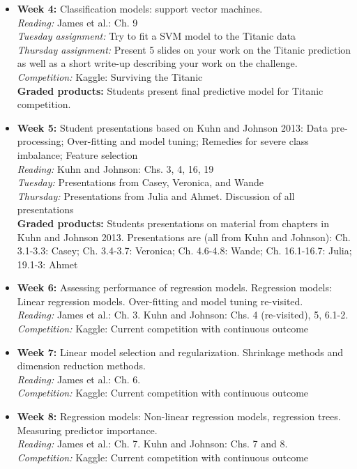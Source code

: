 \documentclass[11pt,oneside]{amsart}
\begin{document}
\begin{itemize}
\item \textbf{Week 4:} Classification models: support vector
  machines.\\
\emph{Reading:} James et al.: Ch. 9\\
\emph{Tuesday assignment:} Try to fit a SVM model to the Titanic data\\
\emph{Thursday assignment:} Present 5 slides on your work on the Titanic prediction as well as a short write-up describing your work on the challenge.\\
\emph{Competition:} Kaggle: Surviving the Titanic\\
\textbf{Graded products:} Students present final predictive model for Titanic
competition.

\item \textbf{Week 5:} Student presentations based on Kuhn and Johnson
  2013: Data pre-processing; Over-fitting and model tuning; Remedies
  for severe class imbalance; Feature selection\\
\emph{Reading:} Kuhn and Johnson: Chs. 3, 4, 16, 19\\
\emph{Tuesday:} Presentations from Casey, Veronica, and Wande\\
\emph{Thursday:} Presentations from Julia and Ahmet. Discussion of all presentations\\
\textbf{Graded products:} Students presentations on material from chapters in Kuhn and
Johnson 2013. Presentations are (all from Kuhn and Johnson): Ch. 3.1-3.3: Casey; Ch. 3.4-3.7: Veronica; Ch. 4.6-4.8: Wande; Ch. 16.1-16.7: Julia; 19.1-3: Ahmet\\

\item \textbf{Week 6:} Assessing performance of regression
  models. Regression models: Linear regression models. Over-fitting
  and model tuning re-visited.\\
\emph{Reading:} James et al.: Ch. 3. Kuhn and Johnson: Chs. 4
(re-visited), 5, 6.1-2.\\
\emph{Competition:} Kaggle: Current competition with continuous
outcome

\item \textbf{Week 7:} Linear model selection and
  regularization. Shrinkage methods and dimension reduction methods.\\
\emph{Reading:} James et al.: Ch. 6.\\
\emph{Competition:} Kaggle: Current competition with continuous
outcome

\item \textbf{Week 8:} Regression models: Non-linear regression
  models, regression trees. Measuring predictor importance.\\
\emph{Reading:} James et al.: Ch. 7. Kuhn and Johnson: Chs. 7 and 8.\\
\emph{Competition:} Kaggle: Current competition with continuous
outcome


\end{itemize}
\end{document}
